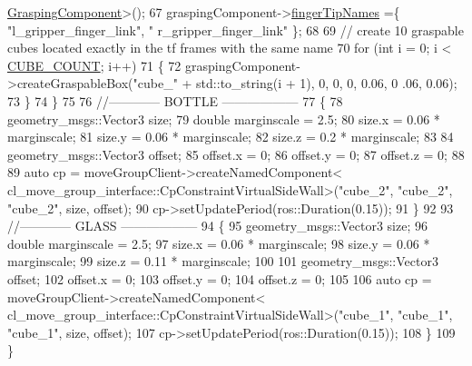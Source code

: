 \begin{DoxyCode}
      \hyperlink{classcl__move__group__interface_1_1GraspingComponent}{GraspingComponent}>();
67                 graspingComponent->\hyperlink{classcl__move__group__interface_1_1GraspingComponent_afc08a0abc3220a377d0bbf798383a42a}{fingerTipNames} =\{ \textcolor{stringliteral}{"l\_gripper\_finger\_link"}, \textcolor{stringliteral}{"
      r\_gripper\_finger\_link"} \};
68 
69                 \textcolor{comment}{// create 10 graspable cubes located exactly in the tf frames with the same name}
70                 \textcolor{keywordflow}{for} (\textcolor{keywordtype}{int} i = 0; i < \hyperlink{namespacesm__moveit__wine__serve_ac6a021cad03473894d9b5adfd589f49b}{CUBE\_COUNT}; i++)
71                 \{
72                     graspingComponent->createGraspableBox(\textcolor{stringliteral}{"cube\_"} + std::to\_string(i + 1), 0, 0, 0, 0.06, 0
      .06, 0.06);
73                 \}
74             \}
75 
76             \textcolor{comment}{//------------ BOTTLE ------------------}
77             \{
78                 geometry\_msgs::Vector3 size;
79                 \textcolor{keywordtype}{double} marginscale = 2.5;
80                 size.x = 0.06 * marginscale;
81                 size.y = 0.06 * marginscale;
82                 size.z = 0.2 * marginscale;
83 
84                 geometry\_msgs::Vector3 offset;
85                 offset.x = 0;
86                 offset.y = 0;
87                 offset.z = 0;
88 
89                 \textcolor{keyword}{auto} cp = moveGroupClient->createNamedComponent<
      cl\_move\_group\_interface::CpConstraintVirtualSideWall>(\textcolor{stringliteral}{"cube\_2"}, \textcolor{stringliteral}{"cube\_2"}, \textcolor{stringliteral}{"cube\_2"}, size, offset);
90                 cp->setUpdatePeriod(ros::Duration(0.15));
91             \}
92 
93             \textcolor{comment}{//------------ GLASS ------------------}
94             \{
95                 geometry\_msgs::Vector3 size;
96                 \textcolor{keywordtype}{double} marginscale = 2.5;
97                 size.x = 0.06 * marginscale;
98                 size.y = 0.06 * marginscale;
99                 size.z = 0.11 * marginscale;
100 
101                 geometry\_msgs::Vector3 offset;
102                 offset.x = 0;
103                 offset.y = 0;
104                 offset.z = 0;
105 
106                 \textcolor{keyword}{auto} cp = moveGroupClient->createNamedComponent<
      cl\_move\_group\_interface::CpConstraintVirtualSideWall>(\textcolor{stringliteral}{"cube\_1"}, \textcolor{stringliteral}{"cube\_1"}, \textcolor{stringliteral}{"cube\_1"}, size, offset);
107                 cp->setUpdatePeriod(ros::Duration(0.15));
108             \}
109         \}
\end{DoxyCode}
